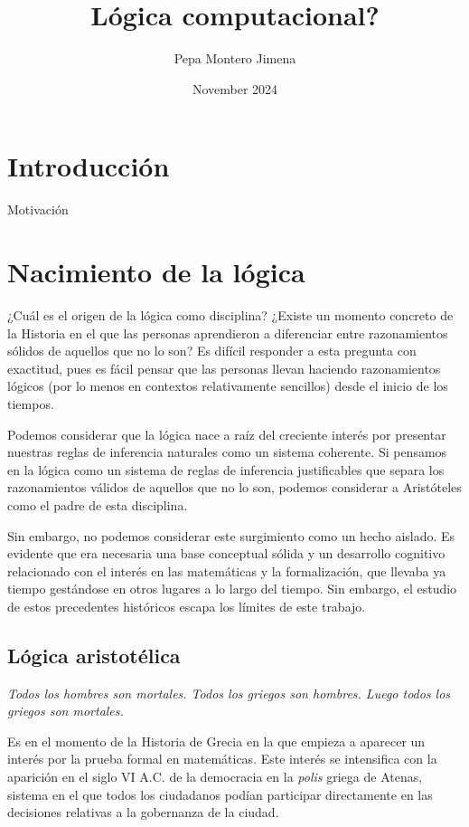 \documentclass{article}
\title{Lógica computacional?}
\author{Pepa Montero Jimena}
\date{November 2024}
\begin{document}
\maketitle


\section{Introducción}

Motivación


\section{Nacimiento de la lógica}

¿Cuál es el origen de la lógica como disciplina? ¿Existe un momento concreto de la Historia en el que las personas aprendieron a diferenciar entre razonamientos sólidos de aquellos que no lo son? Es difícil responder a esta pregunta con exactitud, pues es fácil pensar que las personas llevan haciendo razonamientos lógicos (por lo menos en contextos relativamente sencillos) desde el inicio de los tiempos.

Podemos considerar que la lógica nace a raíz del creciente interés por presentar nuestras reglas de inferencia naturales como un sistema coherente. Si pensamos en la lógica como un sistema de reglas de inferencia justificables que separa los razonamientos válidos de aquellos que no lo son, podemos considerar a Aristóteles como el padre de esta disciplina.\cite{moravcsik2004logic} 

Sin embargo, no podemos considerar este surgimiento como un hecho aislado. Es evidente que era necesaria una base conceptual sólida y un desarrollo cognitivo relacionado con el interés en las matemáticas y la formalización, que llevaba ya tiempo gestándose en otros lugares a lo largo del tiempo. Sin embargo, el estudio de estos precedentes históricos escapa los límites de este trabajo.

\subsection{Lógica aristotélica}

\begin{displayquote}
    \textit{Todos los hombres son mortales. Todos los griegos son hombres. Luego todos los griegos son mortales.}
\end{displayquote}

Es en el momento de la Historia de Grecia en la que empieza a aparecer un interés por la prueba formal en matemáticas. Este interés se intensifica con la aparición en el siglo VI A.C. de la democracia en la \textit{polis} griega de Atenas, sistema en el que todos los ciudadanos podían participar directamente en las decisiones relativas a la gobernanza de la ciudad.
\end{document}
